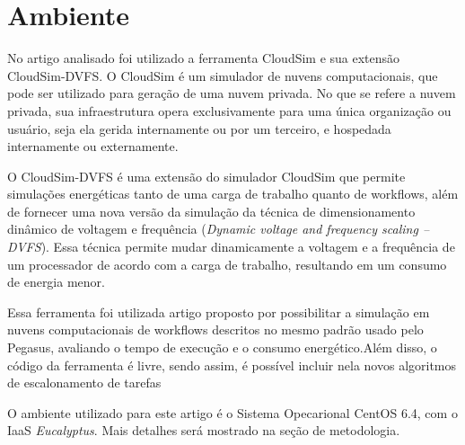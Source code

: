 \section{Ambiente}

No artigo analisado foi utilizado a ferramenta CloudSim e sua extensão CloudSim-DVFS. O CloudSim é
um simulador de nuvens computacionais, que pode ser utilizado para geração de uma nuvem privada.
No que se refere a nuvem privada, sua infraestrutura opera exclusivamente para uma única organização ou usuário,
seja ela gerida internamente ou por um terceiro, e hospedada internamente ou externamente.

O CloudSim-DVFS é uma extensão do simulador CloudSim que permite simulações energéticas tanto de uma
carga de trabalho quanto de workflows, além de fornecer uma nova versão da simulação da técnica
de dimensionamento dinâmico de voltagem e frequência (\textit{Dynamic voltage and frequency scaling – DVFS}).
Essa técnica permite mudar dinamicamente a voltagem e a frequência de um processador de acordo com
a carga de trabalho, resultando em um consumo de energia menor. \cite{elaine_et_al:14}

Essa ferramenta foi utilizada artigo proposto por possibilitar a simulação em nuvens computacionais
de workflows descritos no mesmo padrão usado pelo Pegasus, avaliando o tempo de execução e o consumo energético.Além disso, o código da ferramenta é livre, sendo assim, é possível incluir nela novos algoritmos de escalonamento de tarefas

O ambiente utilizado para este artigo é o Sistema Opecarional CentOS 6.4, com o IaaS \textit{Eucalyptus}. Mais detalhes será mostrado na seção de metodologia.
